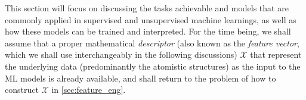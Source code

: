 This section will focus on discussing the tasks achievable and models that are commonly applied in supervised and unsupervised machine learnings, as well as how these models can be trained and interpreted. For the time being, we shall assume that a proper mathematical \textit{descriptor} (also known as the \textit{feature vector}, which we shall use interchangeably in the following discussions) $\mathcal{X}$ that represent the underlying data (predominantly the atomistic structures) as the input to the ML models is already available, and shall return to the problem of how to construct $\mathcal{X}$ in \cref{sec:feature_eng}.
